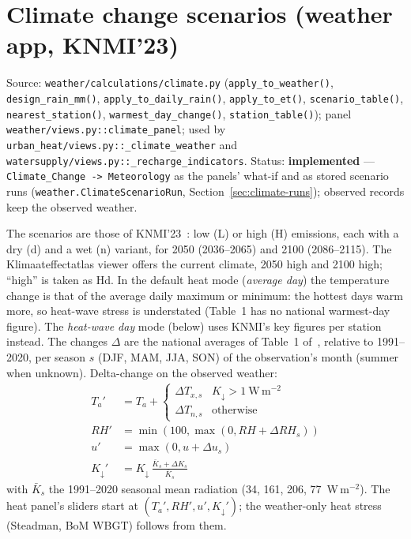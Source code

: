 \documentclass[11pt]{article}
\newcommand{\code}[1]{\texttt{#1}}
\begin{document}
\section{Climate change scenarios (weather app, KNMI'23)}
\label{sec:climate-scenarios}

Source: \code{weather/calculations/climate.py} (\code{apply\_to\_weather()}, \code{design\_rain\_mm()}, \code{apply\_to\_daily\_rain()}, \code{apply\_to\_et()}, \code{scenario\_table()}, \code{nearest\_station()}, \code{warmest\_day\_change()}, \code{station\_table()}); panel \code{weather/views.py::climate\_panel}; used by \code{urban\_heat/views.py::\_climate\_weather} and \code{watersupply/views.py::\_recharge\_indicators}. Status: \textbf{implemented} --- \code{Climate\_Change -> Meteorology} as the panels' what-if and as stored scenario runs (\code{weather.ClimateScenarioRun}, Section~\ref{sec:climate-runs}); observed records keep the observed weather.

The scenarios are those of KNMI'23~\cite{KNMI2023}: low (L) or high (H) emissions, each with a dry (d) and a wet (n) variant, for 2050 (2036--2065) and 2100 (2086--2115). The Klimaateffectatlas viewer offers the current climate, 2050 high and 2100 high; ``high'' is taken as Hd. In the default heat mode (\emph{average day}) the temperature change is that of the average daily maximum or minimum: the hottest days warm more, so heat-wave stress is understated (Table~1 has no national warmest-day figure). The \emph{heat-wave day} mode (below) uses KNMI's key figures per station instead. The changes $\Delta$ are the national averages of Table~1 of~\cite{KNMI2023}, relative to 1991--2020, per season $s$ (DJF, MAM, JJA, SON) of the observation's month (summer when unknown). Delta-change on the observed weather:
\begin{align}
T_a' &= T_a + \begin{cases} \Delta T_{x,s} & K_\downarrow > 1~\mathrm{W\,m^{-2}} \\ \Delta T_{n,s} & \text{otherwise} \end{cases} \\
RH' &= \min\!\left(100, \max(0, RH + \Delta RH_s)\right) \\
u' &= \max(0, u + \Delta u_s) \\
K_\downarrow' &= K_\downarrow \, \frac{\bar K_s + \Delta K_s}{\bar K_s}
\end{align}
with $\bar K_s$ the 1991--2020 seasonal mean radiation (34, 161, 206, 77~W\,m$^{-2}$). The heat panel's sliders start at $(T_a', RH', u', K_\downarrow')$; the weather-only heat stress (Steadman, BoM WBGT) follows from them.
\end{document}
